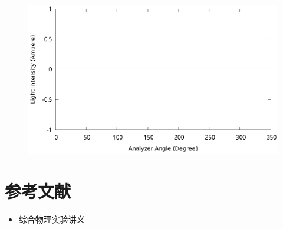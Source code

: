 \documentclass{ctexart}
\begin{document}
    \begin{figure}[H]
      \centering
      \includegraphics[width=\linewidth]{../output/analyzer-angle-light-intensity-16.gnuplot}
    \end{figure}
    \section{参考文献}
    \begin{itemize}[leftmargin=0pt]
        \item[] 综合物理实验讲义
    \end{itemize}
\end{document}
